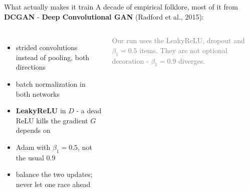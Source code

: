 \documentclass[aspectratio=169]{beamer}
\begin{document}
\begin{frame}{What actually makes it train}
  \small
  A decade of empirical folklore, most of it from \textbf{DCGAN} - \textbf{Deep
  Convolutional GAN} (Radford et al., 2015):
  \vskip 4pt
  \begin{columns}[T]
    \footnotesize
    \begin{itemize}\setlength\itemsep{2pt}
      \item strided convolutions instead of pooling, both directions
      \item batch normalization in both networks
      \item \textbf{LeakyReLU} in $D$ - a dead ReLU kills the gradient $G$ depends on
      \item Adam with $\beta_1 = 0.5$, not the usual $0.9$
      \item balance the two updates; never let one race ahead
    \end{itemize}
    \vskip 4pt
    \textcolor{gray}{Our run uses the LeakyReLU, dropout and $\beta_1=0.5$ items. They are
    not optional decoration - $\beta_1=0.9$ diverges.}
  \end{columns}
\end{frame}
\end{document}
